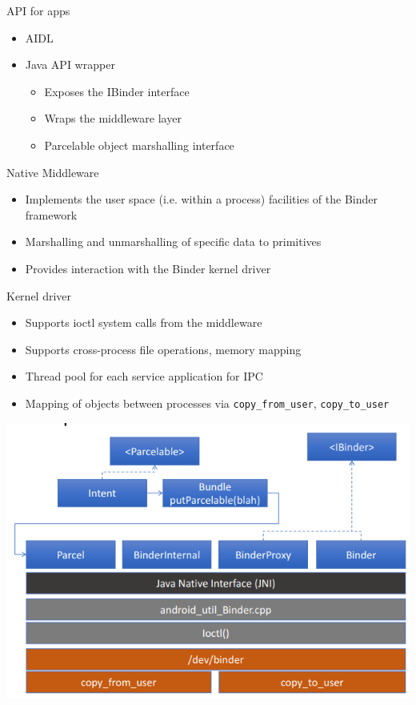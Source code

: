\documentclass{article}
\begin{document}
\begin{flushleft}
API for apps
\begin{itemize}
  \item AIDL
  \item Java API wrapper
  \begin{itemize}
    \item  Exposes the IBinder interface
    \item Wraps the middleware layer
    \item Parcelable object marshalling interface
  \end{itemize}
\end{itemize}
Native Middleware
\begin{itemize}
  \item Implements the user space (i.e. within a process) facilities of the Binder framework
  \item Marshalling and unmarshalling of specific data to primitives 
  \item Provides interaction with the Binder kernel driver
\end{itemize}
Kernel driver
\begin{itemize}
  \item Supports ioctl system calls from the middleware
  \item Supports cross-process file operations, memory mapping
  \item Thread pool for each service application for IPC
  \item Mapping of objects between processes via \verb|copy_from_user|, \verb|copy_to_user|
\end{itemize}
\end{flushleft}

\begin{center}
  \includegraphics[scale=0.5]{binder_implem.png}
\end{center}
\end{document}
